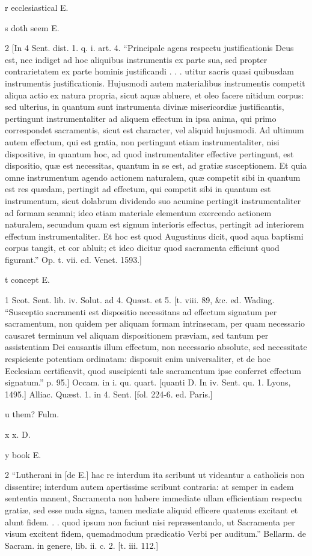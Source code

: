 r
ecclesiastical E.

s
doth seem E.

2
[In 4 Sent. dist. 1. q. i. art. 4. “Principale agens respectu justificationis Deus est, nec indiget ad hoc aliquibus instrumentis ex parte sua, sed propter contrarietatem ex parte hominis justificandi . . . utitur sacris quasi quibusdam instrumentis justificationis. Hujusmodi autem materialibus instrumentis competit aliqua actio ex natura propria, sicut aquæ abluere, et oleo facere nitidum corpus: sed ulterius, in quantum sunt instrumenta divinæ misericordiæ justificantis, pertingunt instrumentaliter ad aliquem effectum in ipsa anima, qui primo correspondet sacramentis, sicut est character, vel aliquid hujusmodi. Ad ultimum autem effectum, qui est gratia, non pertingunt etiam instrumentaliter, nisi dispositive, in quantum hoc, ad quod instrumentaliter effective pertingunt, est dispositio, quæ est necessitas, quantum in se est, ad gratiæ susceptionem. Et quia omne instrumentum agendo actionem naturalem, quæ competit sibi in quantum est res quædam, pertingit ad effectum, qui competit sibi in quantum est instrumentum, sicut dolabrum dividendo suo acumine pertingit instrumentaliter ad formam scamni; ideo etiam materiale elementum exercendo actionem naturalem, secundum quam est signum interioris effectus, pertingit ad interiorem effectum instrumentaliter. Et hoc est quod Augustinus dicit, quod aqua baptismi corpus tangit, et cor abluit; et ideo dicitur quod sacramenta efficiunt quod figurant.” Op. t. vii. ed. Venet. 1593.]

t
concept E.

1
Scot. Sent. lib. iv. Solut. ad 4. Quæst. et 5. [t. viii. 89, &c. ed. Wading. “Susceptio sacramenti est dispositio necessitans ad effectum signatum per sacramentum, non quidem per aliquam formam intrinsecam, per quam necessario causaret terminum vel aliquam dispositionem præviam, sed tantum per assistentiam Dei causantis illum effectum, non necessario absolute, sed necessitate respiciente potentiam ordinatam: disposuit enim universaliter, et de hoc Ecclesiam certificavit, quod suscipienti tale sacramentum ipse conferret effectum signatum.” p. 95.] Occam. in i. qu. quart. [quanti D. In iv. Sent. qu. 1. Lyons, 1495.] Alliac. Quæst. 1. in 4. Sent. [fol. 224-6. ed. Paris.]

u
them? Fulm.

x
x. D.

y
book E.

2
“Lutherani in [de E.] hac re interdum ita scribunt ut videantur a catholicis non dissentire; interdum autem apertissime scribunt contraria: at semper in eadem sententia manent, Sacramenta non habere immediate ullam efficientiam respectu gratiæ, sed esse nuda signa, tamen mediate aliquid efficere quatenus excitant et alunt fidem. . . quod ipsum non faciunt nisi repræsentando, ut Sacramenta per visum excitent fidem, quemadmodum prædicatio Verbi per auditum.” Bellarm. de Sacram. in genere, lib. ii. c. 2. [t. iii. 112.]


